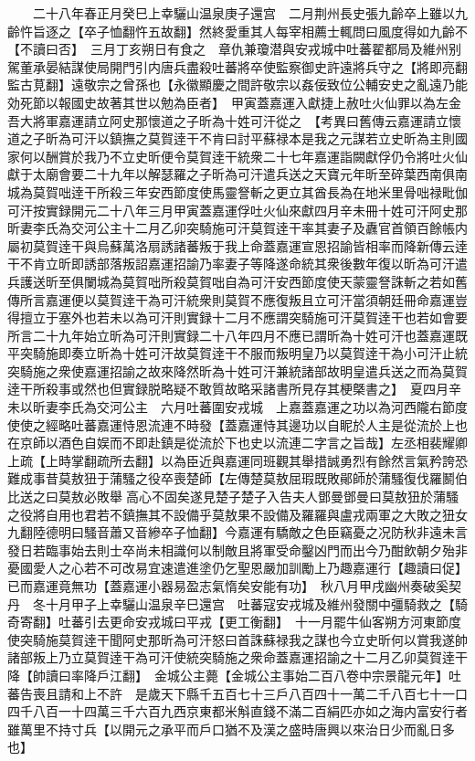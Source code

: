 　　二十八年春正月癸巳上幸驪山温泉庚子還宫　二月荆州長史張九齡卒上雖以九齡忤旨逐之【卒子恤翻忤五故翻】然終愛重其人每宰相薦士輒問曰風度得如九齡不【不讀曰否】　三月丁亥朔日有食之　章仇兼瓊潜與安戎城中吐蕃翟都局及維州别駕董承晏結謀使局開門引内唐兵盡殺吐蕃將卒使監察御史許遠將兵守之【將即亮翻監古莧翻】遠敬宗之曾孫也【永徽顯慶之間許敬宗以姦佞致位公輔安史之亂遠乃能効死節以報國史故著其世以勉為臣者】　甲寅蓋嘉運入獻捷上赦吐火仙罪以為左金吾大將軍嘉運請立阿史那懷道之子昕為十姓可汗從之　【考異曰舊傳云嘉運請立懷道之子昕為可汗以鎮撫之莫賀逹干不肯曰討平蘇禄本是我之元謀若立史昕為主則國家何以酬賞於我乃不立史昕便令莫賀逹干統衆二十七年嘉運詣闕獻俘仍令將吐火仙獻于太廟會要二十九年以解瑟羅之子昕為可汗遣兵送之天寶元年昕至碎葉西南俱南城為莫賀咄逹干所殺三年安西節度使馬靈詧斬之更立其酋長為在地米里骨咄禄毗伽可汗按實録開元二十八年三月甲寅蓋嘉運俘吐火仙來獻四月辛未冊十姓可汗阿史那昕妻李氏為交河公主十二月乙卯突騎施可汗莫賀逹干率其妻子及纛官首領百餘帳内屬初莫賀逹干與烏蘇萬洛扇誘諸蕃叛于我上命蓋嘉運宣恩招諭皆相率而降新傳云逹干不肯立昕即誘部落叛詔嘉運招諭乃率妻子等降遂命統其衆後數年復以昕為可汗遣兵護送昕至俱闌城為莫賀咄所殺莫賀咄自為可汗安西節度使天蒙靈詧誅斬之若如舊傳所言嘉運便以莫賀逹干為可汗統衆則莫賀不應復叛且立可汗當須朝廷冊命嘉運豈得擅立于塞外也若未以為可汗則實録十二月不應謂突騎施可汗莫賀逹干也若如會要所言二十九年始立昕為可汗則實録二十八年四月不應已謂昕為十姓可汗也蓋嘉運既平突騎施即奏立昕為十姓可汗故莫賀逹干不服而叛明皇乃以莫賀逹干為小可汗止統突騎施之衆使嘉運招諭之故來降然昕為十姓可汗兼統諸部故明皇遣兵送之而為莫賀逹干所殺事或然也但實録脱略疑不敢質故略采諸書所見存其梗槩書之】　夏四月辛未以昕妻李氏為交河公主　六月吐蕃圍安戎城　上嘉蓋嘉運之功以為河西隴右節度使使之經略吐蕃嘉運恃恩流連不時發【蓋嘉運恃其邊功以自眤於人主是從流於上也在京師以酒色自娱而不即赴鎮是從流於下也史以流連二字言之旨哉】左丞相裴耀卿上疏【上時掌翻疏所去翻】以為臣近與嘉運同班觀其舉措誠勇烈有餘然言氣矜誇恐難成事昔莫敖狃于蒲騷之役卒喪楚師【左傳楚莫敖屈瑕既敗鄖師於蒲騷復伐羅鬭伯比送之曰莫敖必敗舉高心不固矣遂見楚子楚子入告夫人鄧曼鄧曼曰莫敖狃於蒲騷之役將自用也君若不鎮撫其不設備乎莫敖果不設備及羅羅與盧戎兩軍之大敗之狃女九翻陸德明曰騷音蕭又音縿卒子恤翻】今嘉運有驕敵之色臣竊憂之况防秋非遠未言發日若臨事始去則士卒尚未相識何以制敵且將軍受命鑿凶門而出今乃酣飲朝夕殆非憂國愛人之心若不可改易宜速遣進塗仍乞聖恩嚴加訓勵上乃趣嘉運行【趣讀曰促】已而嘉運竟無功【蓋嘉運小器易盈志氣惰矣安能有功】　秋八月甲戌幽州奏破奚契丹　冬十月甲子上幸驪山温泉辛巳還宫　吐蕃寇安戎城及維州發關中彊騎救之【騎奇寄翻】吐蕃引去更命安戎城曰平戎【更工衡翻】　十一月罷牛仙客朔方河東節度使突騎施莫賀逹干聞阿史那昕為可汗怒曰首誅蘇禄我之謀也今立史昕何以賞我遂帥諸部叛上乃立莫賀逹干為可汗使統突騎施之衆命蓋嘉運招諭之十二月乙卯莫賀逹干降【帥讀曰率降戶江翻】　金城公主薨【金城公主事始二百八卷中宗景龍元年】吐蕃告喪且請和上不許　是歲天下縣千五百七十三戶八百四十一萬二千八百七十一口四千八百一十四萬三千六百九西京東都米斛直錢不滿二百絹匹亦如之海内富安行者雖萬里不持寸兵【以開元之承平而戶口猶不及漢之盛時唐興以來治日少而亂日多也】

